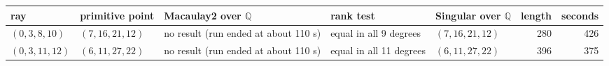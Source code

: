 \begin{tabular}{@{}>{\raggedright\arraybackslash}p{2.1cm}>{\raggedright\arraybackslash}p{2cm}>{\raggedright\arraybackslash}p{1.8cm}>{\raggedright\arraybackslash}p{2.2cm}>{\raggedright\arraybackslash}p{2.2cm}rr@{}}
\toprule
ray & primitive point & Macaulay2 over $\mathbb{Q}$ & rank test & Singular over $\mathbb{Q}$ & length & seconds\\
\midrule
$(0,3,8,10)$ & $(7,16,21,12)$ & no result (run ended at about 110 s) & equal in all 9 degrees & $(7,16,21,12)$ & 280 & 426\\
$(0,3,11,12)$ & $(6,11,27,22)$ & no result (run ended at about 110 s) & equal in all 11 degrees & $(6,11,27,22)$ & 396 & 375\\
\bottomrule
\end{tabular}
